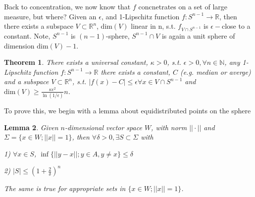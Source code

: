 \documentclass[12pt]{article}
\newtheorem{thm}{Theorem}[section]
\newtheorem{lemma}[thm]{Lemma}
\theoremstyle{remark}
\newcommand{\nats}[0] { \mathbb{N}}
\newcommand{\reals}[0] { \mathbb{R}}
\newcommand{\rarw}[0] { \rightarrow }
\begin{document}
Back to concentration, we now know that $f$ concnetrates on a set of large measure, but where? Given an $\epsilon$, and 1-Lipschitz function $f: S^{n-1} \rarw \reals$, then there exists a subspace $V \subset \reals^n$, $\textrm{dim}(V)$ linear in n, s.t. $f_{V \cap S^{n-1}}$ is $\epsilon-$close  to a constant. Note, $S^{n-1}$ is $(n-1)$-sphere, $S^{n-1} \cap V$ is again a unit sphere of dimension $\textrm{dim}(V)-1$.

\begin{thm}

There exists a universal constant, $\kappa >0$, s.t. $\epsilon>0, \forall n \in \nats$, any 1-Lipschitz function $f:S^{n-1} \rarw \reals$ there exists a constant, $C$ (e.g. median or averge) and a subspace $V \subset \reals^n$, s.t. $|f(x) - C| \le \epsilon \forall x \in V \cap S^{n-1}$ and $\textrm{dim}(V) \ge \frac{\kappa \epsilon^2}{\ln(1/ \epsilon)} n$.

\end{thm}

To prove this, we begin with a lemma about equidistributed points on the sphere

\begin{lemma}
Given $n$-dimensional vector space $W$, with norm $|| \cdot ||$ and $ \Sigma = \{ x \in W; ||x|| = 1 \}$, then $\forall \delta > 0, \exists S \subset \Sigma$ with 

1) $\forall x \in S$, $\inf \{  || y-x||; y \in A, y \not = x \} \le \delta$

2) $|S| \le ( 1 + \frac{2}{\delta})^n$

The same is true for appropriate sets in $\{ x \in W; ||x|| =1 \}$.

\end{lemma}
\end{document}
